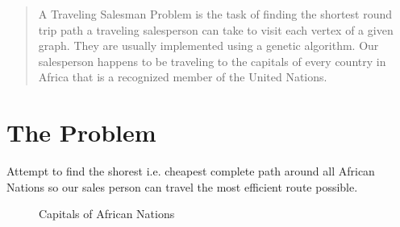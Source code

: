 \documentclass[12pt]{article}
\begin{document}
\maketitle

\begin{abstract}
  A Traveling Salesman Problem is the task of finding
the shortest round trip path a traveling salesperson can take
to visit each vertex of a given graph.  They are usually
implemented using a genetic algorithm. Our salesperson
happens to be traveling to the capitals of every country in Africa that is a recognized member of the United Nations.
\end{abstract}

\section{The Problem}

  Attempt to find the shorest i.e. cheapest complete path around all African Nations so our sales person can travel the most efficient route possible.

\begin{figure}[h!]
  \begin{center}
    \setlength\fboxsep{1.00pt}
    \setlength\fboxrule{1.00pt}
    \caption{Capitals of African Nations}
  \end{center}
\end{figure}
\end{document}
